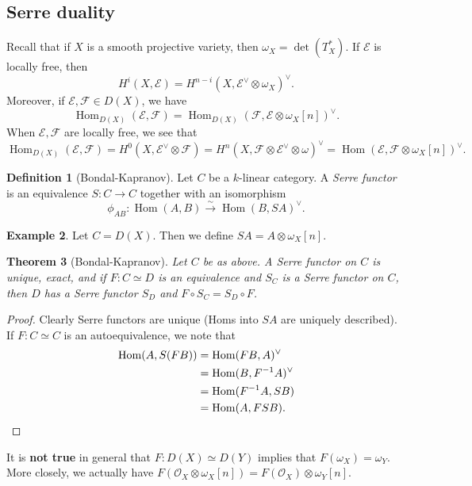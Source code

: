 \documentclass{amsart}
\newtheorem{thm}{Theorem}[section]
\theoremstyle{definition}
\newtheorem{defn}[thm]{Definition}
\newtheorem{exm}[thm]{Example}
\theoremstyle{remark}
\theoremstyle{plain}
\theoremstyle{definition}
\theoremstyle{remark}
\newcommand{\mc}[1]{\mathcal{#1}}
\newcommand{\1}{\mathbf{1}}
\newcommand{\2}{\mathbf{2}}
\newcommand{\3}{\mathbf{3}}
\DeclareMathOperator{\Hom}{Hom}
\begin{document}
\subsection{Serre duality}

Recall that if $X$ is a smooth projective variety, then $\omega_X = \det (T_X^*)$. If $\mc{E}$ is locally free, then
\[ H^i(X, \mc{E}) = H^{n-i}(X, \mc{E}^{\vee} \otimes \omega_X)^{\vee}. \]
Moreover, if $\mc{E}, \mc{F} \in D(X)$, we have
\[ \Hom_{D(X)}(\mc{E}, \mc{F}) = \Hom_{D(X)}(\mc{F}, \mc{E} \otimes \omega_X[n])^{\vee}. \]
When $\mc{E}, \mc{F}$ are locally free, we see that
\[ \Hom_{D(X)}(\mc{E}, \mc{F}) = H^0(X, \mc{E}^{\vee} \otimes \mc{F}) = H^n(X, \mc{F} \otimes \mc{E}^{\vee} \otimes \omega)^{\vee} = \Hom(\mc{E}, \mc{F} \otimes \omega_X[n])^{\vee}. \]

\begin{defn}[Bondal-Kapranov]
    Let $C$ be a $k$-linear category. A \textit{Serre functor} is an equivalence $S \colon C \to C$ together with an isomorphism
    \[ \phi_{AB} \colon \Hom(A,B) \xrightarrow{\sim} \Hom(B, SA)^{\vee}. \]
\end{defn}

\begin{exm}
    Let $C = D(X)$. Then we define $SA = A \otimes \omega_X[n]$.
\end{exm}

\begin{thm}[Bondal-Kapranov]
    Let $C$ be as above. A Serre functor on $C$ is unique, exact, and if $F \colon C \simeq D$ is an equivalence and $S_C$ is a Serre functor on $C$, then $D$ has a Serre functor $S_D$ and $F \circ S_C = S_D \circ F$.
\end{thm}

\begin{proof}
    Clearly Serre functors are unique (Homs into $SA$ are uniquely described). If $F \colon C \simeq C$ is an autoequivalence, we note that 
    \begin{align*} 
        \Hom(A, S(FB)) &= \Hom(FB, A)^{\vee} \\ 
        &= \Hom(B, F^{-1}A)^{\vee} \\ 
        &= \Hom(F^{-1}A, SB) \\
        &= \Hom(A, FSB). \qedhere
    \end{align*}
\end{proof}

It is \textbf{not true} in general that $F \colon D(X) \simeq D(Y)$ implies that $F(\omega_X) = \omega_Y$. More closely, we actually have $F(\mc{O}_X \otimes \omega_X[n]) = F(\mc{O}_X) \otimes \omega_Y[n]$.
\end{document}
